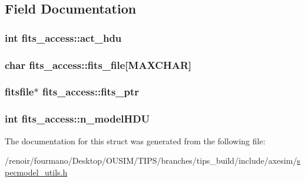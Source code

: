 \subsection{Field Documentation}
\hypertarget{structfits__access_a210b0f35b33c7e271b3d288d05782dbf}{
\subsubsection[{act\_\-hdu}]{\setlength{\rightskip}{0pt plus 5cm}int {\bf fits\_\-access::act\_\-hdu}}}
\label{structfits__access_a210b0f35b33c7e271b3d288d05782dbf}
\hypertarget{structfits__access_af606a81f066e75230aa061386ddede21}{
\subsubsection[{fits\_\-file}]{\setlength{\rightskip}{0pt plus 5cm}char {\bf fits\_\-access::fits\_\-file}\mbox{[}MAXCHAR\mbox{]}}}
\label{structfits__access_af606a81f066e75230aa061386ddede21}
\hypertarget{structfits__access_afdf355de50df0d99e3186ad2fddcd2b6}{
\subsubsection[{fits\_\-ptr}]{\setlength{\rightskip}{0pt plus 5cm}fitsfile$\ast$ {\bf fits\_\-access::fits\_\-ptr}}}
\label{structfits__access_afdf355de50df0d99e3186ad2fddcd2b6}
\hypertarget{structfits__access_a241260b89300c1d0fa1356f279c1319c}{
\subsubsection[{n\_\-modelHDU}]{\setlength{\rightskip}{0pt plus 5cm}int {\bf fits\_\-access::n\_\-modelHDU}}}
\label{structfits__access_a241260b89300c1d0fa1356f279c1319c}


The documentation for this struct was generated from the following file:\begin{DoxyCompactItemize}
\item 
/renoir/fourmano/Desktop/OUSIM/TIPS/branches/tips\_\-build/include/axesim/\hyperlink{specmodel__utils_8h}{specmodel\_\-utils.h}\end{DoxyCompactItemize}
